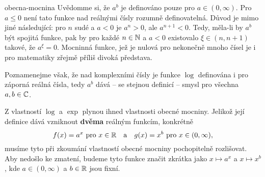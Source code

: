 \begin{warning}{}{obecna-mocnina}
 Uvědomme si, že $a^{b}$ je definováno pouze pro $a \in (0,\infty)$. Pro $a \leq
 0$ není tato funkce nad reálnými čísly rozumně definovatelná. Důvod je mimo
 jiné následující: pro $n$ sudé a $a < 0$ je $a^{n} > 0$, ale $a^{n+1} < 0$.
 Tedy, měla-li by $a^{b}$ být spojitá funkce, pak by pro každé $n \in \mathbb{N}$ a $a <
 0$ existovalo $\xi \in (n,n+1)$ takové, že $a^{\xi} = 0$. Mocninná funkce, jež
 je nulová pro nekonečně mnoho čísel je i pro matematiky zřejmě příliš divoká
 představa.

 Poznamenejme však, že nad komplexními čísly je funkce $\log$ definována i pro
 záporná reálná čísla, tedy $a^{b}$ dává -- se stejnou definicí -- smysl pro
 všechna $a,b \in \mathbb{C}$.
\end{warning}

Z vlastností $\log$ a $\exp$ plynou ihned vlastnosti obecné mocniny. Jelikož
její definice dává vzniknout \textbf{dvěma} reálným funkcím, konkrétně
\[
 f(x) = a^{x} \text{ pro } x \in \mathbb{R} \quad \text{a} \quad g(x) = x^{b} \text{
 pro } x \in (0,\infty),
\]
musíme tyto při zkoumání vlastností obecné mocniny pochopitelně rozlišovat. Aby
nedošlo ke zmatení, budeme tyto funkce značit zkrátka jako $x \mapsto a^{x}$ a
$x \mapsto x^{b}$, kde $a \in (0,\infty)$ a $b \in \mathbb{R}$ jsou fixní.

